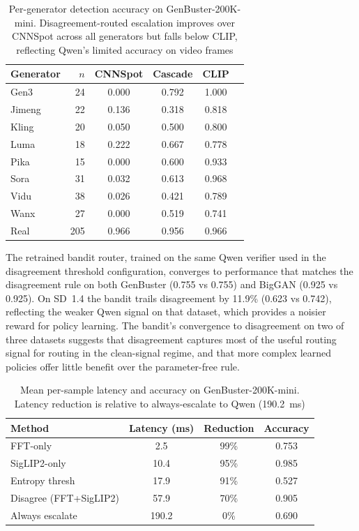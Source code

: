\documentclass{ieeeaccess}
\begin{document}
\begin{table}[h]
\centering
\caption{Per-generator detection accuracy on GenBuster-200K-mini. Disagreement-routed
escalation improves over CNNSpot across all generators but falls below CLIP, reflecting
Qwen's limited accuracy on video frames}
\label{tab:per_generator}
\begin{tabular}{lrcccc}
\toprule
Generator & $n$ & CNNSpot & Cascade & CLIP \\
\midrule
Gen3   & 24  & 0.000 & 0.792 & 1.000 \\
Jimeng & 22  & 0.136 & 0.318 & 0.818 \\
Kling  & 20  & 0.050 & 0.500 & 0.800 \\
Luma   & 18  & 0.222 & 0.667 & 0.778 \\
Pika   & 15  & 0.000 & 0.600 & 0.933 \\
Sora   & 31  & 0.032 & 0.613 & 0.968 \\
Vidu   & 38  & 0.026 & 0.421 & 0.789 \\
Wanx   & 27  & 0.000 & 0.519 & 0.741 \\
\midrule
Real   & 205 & 0.966 & 0.956 & 0.966 \\
\bottomrule
\end{tabular}
\end{table}


The retrained bandit router, trained on the same Qwen verifier used in the disagreement threshold configuration, converges to performance that matches the disagreement rule on both GenBuster (0.755 vs 0.755) and BigGAN (0.925 vs 0.925). On SD~1.4 the bandit trails disagreement by 11.9\% (0.623 vs 0.742), reflecting the weaker Qwen signal on that dataset, which provides a noisier reward for policy learning. The bandit's convergence to disagreement on two of three datasets suggests that disagreement captures most of the useful routing signal for routing in the clean-signal regime, and that more complex learned policies offer little benefit over the parameter-free rule.


\begin{table}[h]
\centering
\caption{Mean per-sample latency and accuracy on GenBuster-200K-mini. Latency reduction
is relative to always-escalate to Qwen (190.2~ms)}
\label{tab:latency}
\begin{tabular}{lccc}
\toprule
Method & Latency (ms) & Reduction & Accuracy \\
\midrule
FFT-only               &   2.5 & 99\%  & 0.753 \\
SigLIP2-only           &  10.4 & 95\%  & 0.985 \\
Entropy thresh         &  17.9 & 91\%  & 0.527 \\
Disagree (FFT+SigLIP2) &  57.9 & 70\%  & 0.905 \\
Always escalate        & 190.2 &  0\%  & 0.690 \\
\bottomrule
\end{tabular}
\end{table}
\end{document}
